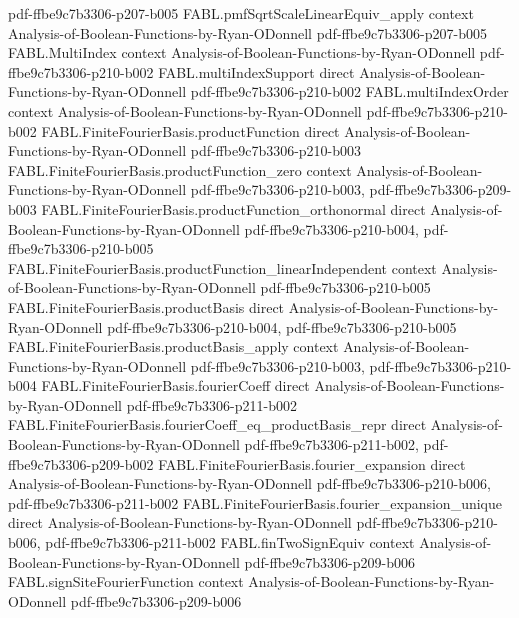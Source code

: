 \begin{theorem}
  {pdf-ffbe9c7b3306-p207-b005}
\proofstep
  {FABL.pmfSqrtScaleLinearEquiv_apply}
  {context}
  {Analysis-of-Boolean-Functions-by-Ryan-ODonnell}
  {pdf-ffbe9c7b3306-p207-b005}
\proofstep
  {FABL.MultiIndex}
  {context}
  {Analysis-of-Boolean-Functions-by-Ryan-ODonnell}
  {pdf-ffbe9c7b3306-p210-b002}
\proofstep
  {FABL.multiIndexSupport}
  {direct}
  {Analysis-of-Boolean-Functions-by-Ryan-ODonnell}
  {pdf-ffbe9c7b3306-p210-b002}
\proofstep
  {FABL.multiIndexOrder}
  {context}
  {Analysis-of-Boolean-Functions-by-Ryan-ODonnell}
  {pdf-ffbe9c7b3306-p210-b002}
\proofstep
  {FABL.FiniteFourierBasis.productFunction}
  {direct}
  {Analysis-of-Boolean-Functions-by-Ryan-ODonnell}
  {pdf-ffbe9c7b3306-p210-b003}
\proofstep
  {FABL.FiniteFourierBasis.productFunction_zero}
  {context}
  {Analysis-of-Boolean-Functions-by-Ryan-ODonnell}
  {pdf-ffbe9c7b3306-p210-b003,
    pdf-ffbe9c7b3306-p209-b003}
\proofstep
  {FABL.FiniteFourierBasis.productFunction_orthonormal}
  {direct}
  {Analysis-of-Boolean-Functions-by-Ryan-ODonnell}
  {pdf-ffbe9c7b3306-p210-b004,
    pdf-ffbe9c7b3306-p210-b005}
\proofstep
  {FABL.FiniteFourierBasis.productFunction_linearIndependent}
  {context}
  {Analysis-of-Boolean-Functions-by-Ryan-ODonnell}
  {pdf-ffbe9c7b3306-p210-b005}
\proofstep
  {FABL.FiniteFourierBasis.productBasis}
  {direct}
  {Analysis-of-Boolean-Functions-by-Ryan-ODonnell}
  {pdf-ffbe9c7b3306-p210-b004,
    pdf-ffbe9c7b3306-p210-b005}
\proofstep
  {FABL.FiniteFourierBasis.productBasis_apply}
  {context}
  {Analysis-of-Boolean-Functions-by-Ryan-ODonnell}
  {pdf-ffbe9c7b3306-p210-b003,
    pdf-ffbe9c7b3306-p210-b004}
\proofstep
  {FABL.FiniteFourierBasis.fourierCoeff}
  {direct}
  {Analysis-of-Boolean-Functions-by-Ryan-ODonnell}
  {pdf-ffbe9c7b3306-p211-b002}
\proofstep
  {FABL.FiniteFourierBasis.fourierCoeff_eq_productBasis_repr}
  {direct}
  {Analysis-of-Boolean-Functions-by-Ryan-ODonnell}
  {pdf-ffbe9c7b3306-p211-b002,
    pdf-ffbe9c7b3306-p209-b002}
\proofstep
  {FABL.FiniteFourierBasis.fourier_expansion}
  {direct}
  {Analysis-of-Boolean-Functions-by-Ryan-ODonnell}
  {pdf-ffbe9c7b3306-p210-b006,
    pdf-ffbe9c7b3306-p211-b002}
\proofstep
  {FABL.FiniteFourierBasis.fourier_expansion_unique}
  {direct}
  {Analysis-of-Boolean-Functions-by-Ryan-ODonnell}
  {pdf-ffbe9c7b3306-p210-b006,
    pdf-ffbe9c7b3306-p211-b002}
\proofstep
  {FABL.finTwoSignEquiv}
  {context}
  {Analysis-of-Boolean-Functions-by-Ryan-ODonnell}
  {pdf-ffbe9c7b3306-p209-b006}
\proofstep
  {FABL.signSiteFourierFunction}
  {context}
  {Analysis-of-Boolean-Functions-by-Ryan-ODonnell}
  {pdf-ffbe9c7b3306-p209-b006}
\proofstep

\end{theorem}
